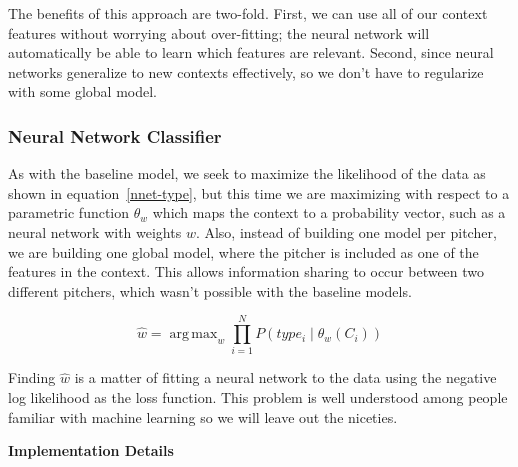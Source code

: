 \documentclass{article}
\DeclareMathOperator*{\argmax}{arg\,max}
\begin{document}
The benefits of this approach are two-fold.  First, we can use all of our context features without worrying about over-fitting; the neural network will automatically be able to learn which features are relevant.  Second, since neural networks generalize to new contexts effectively, so we don't have to regularize with some global model.  

\subsubsection{Neural Network Classifier}

As with the baseline model, we seek to maximize the likelihood of the data as shown in equation~\ref{nnet-type}, but this time we are maximizing with respect to a parametric function $ \theta_w $ which maps the context to a probability vector, such as a neural network with weights $w$.  Also, instead of building one model per pitcher, we are building one global model, where the pitcher is included as one of the features in the context.  This allows information sharing to occur between two different pitchers, which wasn't possible with the baseline models.  

\begin{equation} \label{nnet-type}
\hat{w} = \argmax_{w} \prod_{i=1}^N P(type_i \mid \theta_w(C_i))
\end{equation}

Finding $ \hat{w} $ is a matter of fitting a neural network to the data using the negative log likelihood as the loss function.  This problem is well understood among people familiar with machine learning so we will leave out the niceties.  

\textbf{Implementation Details}
\end{document}

